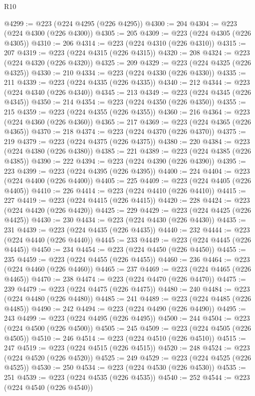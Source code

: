 \begin{lexlean}{R10}
\begin{coremodule}
@4299 := @223 (@224 @4295 (@226 @4295))
@4300 := 204
@4304 := @223 (@224 @4300 (@226 @4300))
@4305 := 205
@4309 := @223 (@224 @4305 (@226 @4305))
@4310 := 206
@4314 := @223 (@224 @4310 (@226 @4310))
@4315 := 207
@4319 := @223 (@224 @4315 (@226 @4315))
@4320 := 208
@4324 := @223 (@224 @4320 (@226 @4320))
@4325 := 209
@4329 := @223 (@224 @4325 (@226 @4325))
@4330 := 210
@4334 := @223 (@224 @4330 (@226 @4330))
@4335 := 211
@4339 := @223 (@224 @4335 (@226 @4335))
@4340 := 212
@4344 := @223 (@224 @4340 (@226 @4340))
@4345 := 213
@4349 := @223 (@224 @4345 (@226 @4345))
@4350 := 214
@4354 := @223 (@224 @4350 (@226 @4350))
@4355 := 215
@4359 := @223 (@224 @4355 (@226 @4355))
@4360 := 216
@4364 := @223 (@224 @4360 (@226 @4360))
@4365 := 217
@4369 := @223 (@224 @4365 (@226 @4365))
@4370 := 218
@4374 := @223 (@224 @4370 (@226 @4370))
@4375 := 219
@4379 := @223 (@224 @4375 (@226 @4375))
@4380 := 220
@4384 := @223 (@224 @4380 (@226 @4380))
@4385 := 221
@4389 := @223 (@224 @4385 (@226 @4385))
@4390 := 222
@4394 := @223 (@224 @4390 (@226 @4390))
@4395 := 223
@4399 := @223 (@224 @4395 (@226 @4395))
@4400 := 224
@4404 := @223 (@224 @4400 (@226 @4400))
@4405 := 225
@4409 := @223 (@224 @4405 (@226 @4405))
@4410 := 226
@4414 := @223 (@224 @4410 (@226 @4410))
@4415 := 227
@4419 := @223 (@224 @4415 (@226 @4415))
@4420 := 228
@4424 := @223 (@224 @4420 (@226 @4420))
@4425 := 229
@4429 := @223 (@224 @4425 (@226 @4425))
@4430 := 230
@4434 := @223 (@224 @4430 (@226 @4430))
@4435 := 231
@4439 := @223 (@224 @4435 (@226 @4435))
@4440 := 232
@4444 := @223 (@224 @4440 (@226 @4440))
@4445 := 233
@4449 := @223 (@224 @4445 (@226 @4445))
@4450 := 234
@4454 := @223 (@224 @4450 (@226 @4450))
@4455 := 235
@4459 := @223 (@224 @4455 (@226 @4455))
@4460 := 236
@4464 := @223 (@224 @4460 (@226 @4460))
@4465 := 237
@4469 := @223 (@224 @4465 (@226 @4465))
@4470 := 238
@4474 := @223 (@224 @4470 (@226 @4470))
@4475 := 239
@4479 := @223 (@224 @4475 (@226 @4475))
@4480 := 240
@4484 := @223 (@224 @4480 (@226 @4480))
@4485 := 241
@4489 := @223 (@224 @4485 (@226 @4485))
@4490 := 242
@4494 := @223 (@224 @4490 (@226 @4490))
@4495 := 243
@4499 := @223 (@224 @4495 (@226 @4495))
@4500 := 244
@4504 := @223 (@224 @4500 (@226 @4500))
@4505 := 245
@4509 := @223 (@224 @4505 (@226 @4505))
@4510 := 246
@4514 := @223 (@224 @4510 (@226 @4510))
@4515 := 247
@4519 := @223 (@224 @4515 (@226 @4515))
@4520 := 248
@4524 := @223 (@224 @4520 (@226 @4520))
@4525 := 249
@4529 := @223 (@224 @4525 (@226 @4525))
@4530 := 250
@4534 := @223 (@224 @4530 (@226 @4530))
@4535 := 251
@4539 := @223 (@224 @4535 (@226 @4535))
@4540 := 252
@4544 := @223 (@224 @4540 (@226 @4540))

\end{coremodule}
\end{lexlean}

